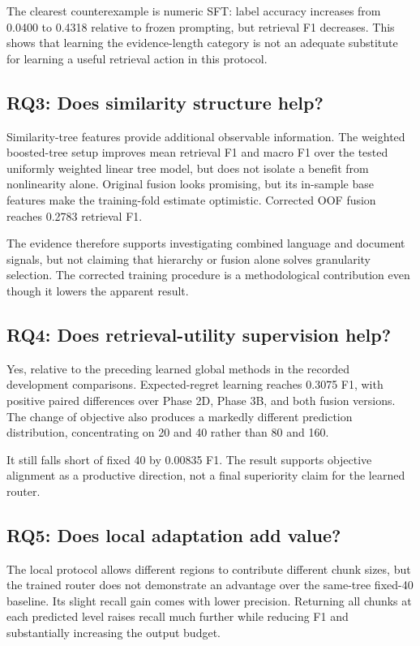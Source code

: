 The clearest counterexample is numeric SFT: label accuracy
increases from 0.0400 to 0.4318 relative to frozen prompting,
but retrieval F1 decreases. This shows that learning the
evidence-length category is not an adequate substitute for
learning a useful retrieval action in this protocol.

\subsection{RQ3: Does similarity structure help?}
Similarity-tree features provide additional observable information.
The weighted boosted-tree setup improves mean retrieval F1 and macro
F1 over the tested uniformly weighted linear tree model, but does not
isolate a benefit from nonlinearity alone. Original fusion looks promising,
but its in-sample base features make the training-fold estimate
optimistic. Corrected OOF fusion reaches 0.2783 retrieval F1.

The evidence therefore supports investigating combined language
and document signals, but not claiming that hierarchy or fusion
alone solves granularity selection. The corrected training
procedure is a methodological contribution even though it lowers
the apparent result.

\subsection{RQ4: Does retrieval-utility supervision help?}
Yes, relative to the preceding learned global methods in the
recorded development comparisons. Expected-regret learning
reaches 0.3075 F1, with positive paired differences over
Phase 2D, Phase 3B, and both fusion versions. The change of
objective also produces a markedly different prediction
distribution, concentrating on 20 and 40 rather than 80 and 160.

It still falls short of fixed 40 by 0.00835 F1. The result
supports objective alignment as a productive direction, not
a final superiority claim for the learned router.

\subsection{RQ5: Does local adaptation add value?}
The local protocol allows different regions to contribute
different chunk sizes, but the trained router does not demonstrate
an advantage over the same-tree fixed-40 baseline. Its slight
recall gain comes with lower precision. Returning all chunks
at each predicted level raises recall much further while
reducing F1 and substantially increasing the output budget.

